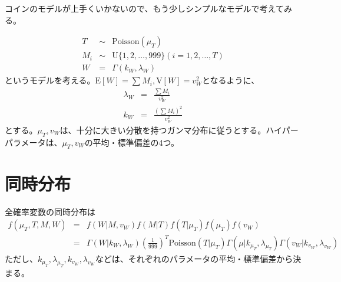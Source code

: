 \documentclass{jsarticle}
\newcommand{\poisson}{\mathrm{Poisson}}
\newcommand{\uniform}{\mathrm{U}}
\newcommand{\expectation}{\mathrm{E}}
\newcommand{\variance}{\mathrm{V}}
\begin{document}
コインのモデルが上手くいかないので、もう少しシンプルなモデルで考えてみる。

\begin{eqnarray*}
 T &\sim& \poisson(\mu_{T}) \\
 M_{i} &\sim& \uniform \{1, 2, \ldots, 999\} (i=1,2,\ldots,T) \\
 W &=& \Gamma(k_{W}, \lambda_{W})
\end{eqnarray*}
というモデルを考える。$\expectation[W] = \sum M_{i}, \variance[W] = v^{2}_{W}$となるように、
\begin{eqnarray*}
 \lambda_{W} &=& \frac{\sum M_{i}}{v^{2}_{W}} \\
 k_{W} &=& \frac{(\sum M_{i})^{2}}{v^{2}_{W}}
\end{eqnarray*}
とする。$\mu_{T}, v_{W}$は、十分に大きい分散を持つガンマ分布に従うとする。ハイパーパラメータは、$\mu_{T}, v_{W}$の平均・標準偏差の4つ。

\section{同時分布}
全確率変数の同時分布は
\begin{eqnarray*}
 f(\mu_{T}, T, M, W) &=& f(W | M, v_{W})f(M | T)f(T|\mu_{T})f(\mu_{T})f(v_{W}) \\
 &=&
  \Gamma(W | k_{W}, \lambda_{W}) \left(\frac{1}{999}\right)^{T} \poisson(T | \mu_{T}) \Gamma(\mu | k_{\mu_{T}}, \lambda_{\mu_{T}}) \Gamma(v_{W} | k_{v_{W}}, \lambda_{v_{W}})
\end{eqnarray*}
ただし、$k_{\mu_{T}}, \lambda_{\mu_{T}}, k_{v_{W}}, \lambda_{v_{W}}$などは、それぞれのパラメータの平均・標準偏差から決まる。
\end{document}
